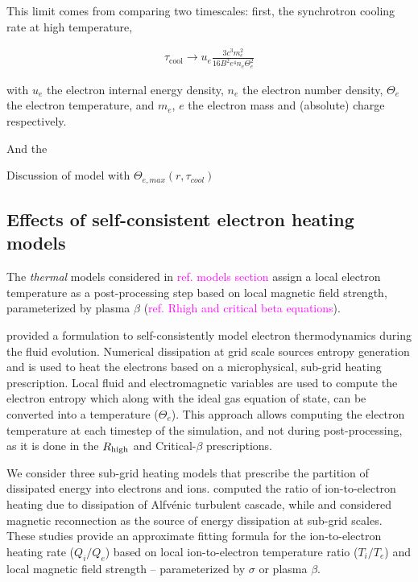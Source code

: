 This limit comes from comparing two timescales: first, the synchrotron cooling rate at high temperature,

\begin{align}
    \tau_\mathrm{cool} \rightarrow u_e \frac{3 c^3 m_e^2}{16 B^2 e^4 n_e \Theta_e^2}
\end{align}

with $u_e$ the electron internal energy density, $n_e$ the electron number density, $\Theta_e$ the electron temperature, and $m_e$, $e$ the electron mass and (absolute) charge respectively.

And the 

Discussion of model with $\Theta_{e,max}(r, \tau_{cool})$




\subsection{Effects of self-consistent electron heating models}

The \textit{thermal} models considered in \textcolor{magenta}{ref. models section} assign a local electron temperature as a post-processing step based on local magnetic field strength, parameterized by plasma $\beta$ (\textcolor{magenta}{ref. Rhigh and critical beta equations}).

\citealt{10.1093/mnras/stv2084} provided a formulation to self-consistently model electron thermodynamics during the fluid evolution. Numerical dissipation at grid scale sources entropy generation and is used to heat the electrons based on a microphysical, sub-grid heating prescription. Local fluid and electromagnetic variables are used to compute the electron entropy which along with the ideal gas equation of state, can be converted into a temperature ($\Theta_{e}$). This approach allows computing the electron temperature at each timestep of the simulation, and not during post-processing, as it is done in the $R_\mathrm{high}$ and Critical-$\beta$ prescriptions.

We consider three sub-grid heating models that prescribe the partition of dissipated energy into electrons and ions. \citealt{2010MNRAS.409L.104H} computed the ratio of ion-to-electron heating due to dissipation of Alfv\'enic turbulent cascade, while \citealt{10.1093/mnras/stx2530} and \citealt{Rowan_2017} considered magnetic reconnection as the source of energy dissipation at sub-grid scales. These studies provide an approximate fitting formula for the ion-to-electron heating rate ($Q_{i}/Q_{e}$) based on local ion-to-electron temperature ratio ($T_{i}/T_{e}$) and local magnetic field strength -- parameterized by $\sigma$ or plasma $\beta$.


